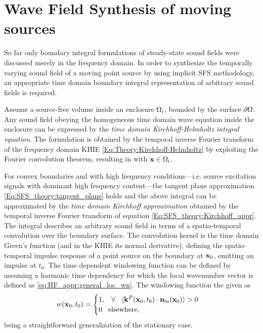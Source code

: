 \section{Wave Field Synthesis of moving sources}
\label{Sec:Moving_source_WFS}

So far only boundary integral formulations of steady-state sound fields were discussed merely in the frequency domain.
In order to synthesize the temporally varying sound field of a moving point source by using implicit SFS methodology, an appropriate time domain boundary integral representation of arbitrary sound fields is required.

Assume a source-free volume inside an enclosure $\Omega_{\mathrm{i}}$, bounded by the surface $\partial \Omega$.
Any sound field obeying the homogeneous time domain wave equation inside the enclosure can be expressed by the \emph{time domain Kirchhoff-Helmholtz integral equation}.
The formulation is obtained by the temporal inverse Fourier transform of the frequency domain KHIE \eqref{Eq:Theory:Kirchhoff-Helmholtz} by exploiting the Fourier convolution theorem, resulting in
with $\mathbf{x} \in \Omega_{\mathrm{i}}$.	

For convex boundaries and with high frequency conditions---i.e. source excitation signals with dominant high frequency content---the tangent plane approximation \eqref{Eq:SFS_theory:tangent_plane} holds and the above integral can be approximated by the \emph{time domain Kirchhoff approximation}
obtained by the temporal inverse Fourier transform of equation \eqref{Eq:SFS_theory:Kirchhoff_appr}.
The integral describes an arbitrary sound field in terms of a spatio-temporal convolution over the boundary surface.
The convolution kernel is the time domain Green's function (and in the KHIE its normal derivative), defining the spatio-temporal impulse response of a point source on the boundary at $\mathbf{x}_0$, emitting an impulse at $t_0$.
The time dependent windowing function can be defined by assuming a harmonic time dependency for which the local wavenumber vector is defined as \eqref{eq:HF_appr:general_loc_wn}. 
The windowing function the given as
\begin{equation}
w(\mathbf{x}_0,t_0) = \begin{cases}
                        1, \hspace{3mm} \forall \hspace{3mm} \langle \mathbf{k}^P(\mathbf{x}_0,t_0) \cdot \mathbf{n}_{\mathrm{in}}(\mathbf{x}_0) \rangle > 0 \\
                        0  \hspace{3mm} \text{elsewhere},
                    \end{cases}
\end{equation}
being a straightforward generalization of the stationary case.

